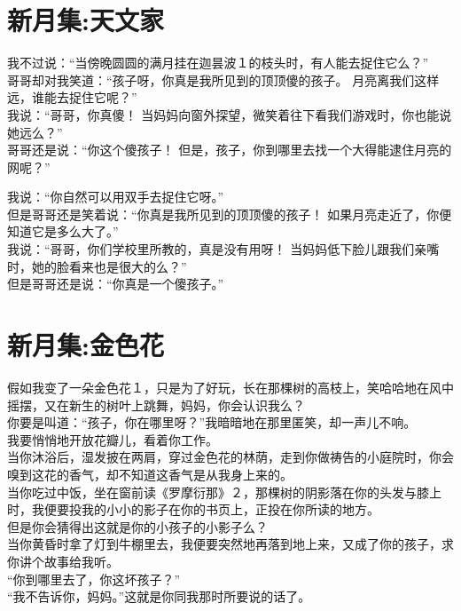 \documentclass[
]{book}
\renewenvironment{quote}{\begin{VF}}{\end{VF}}
\begin{document}
\hypertarget{section-39}{%
\section{新月集:天文家}\label{section-39}}

\begin{quote}
我不过说：``当傍晚圆圆的满月挂在迦昙波１的枝头时，有人能去捉住它么？''\\
哥哥却对我笑道：``孩子呀，你真是我所见到的顶顶傻的孩子。 月亮离我们这样远，谁能去捉住它呢？''\\
我说：``哥哥，你真傻！ 当妈妈向窗外探望，微笑着往下看我们游戏时，你也能说她远么？''\\
哥哥还是说：``你这个傻孩子！ 但是，孩子，你到哪里去找一个大得能逮住月亮的网呢？''

我说：``你自然可以用双手去捉住它呀。''\\
但是哥哥还是笑着说：``你真是我所见到的顶顶傻的孩子！ 如果月亮走近了，你便知道它是多么大了。''\\
我说：``哥哥，你们学校里所教的，真是没有用呀！ 当妈妈低下脸儿跟我们亲嘴时，她的脸看来也是很大的么？''\\
但是哥哥还是说：``你真是一个傻孩子。''
\end{quote}

\hypertarget{section-40}{%
\section{新月集:金色花}\label{section-40}}

\begin{quote}
假如我变了一朵金色花１，只是为了好玩，长在那棵树的高枝上，笑哈哈地在风中摇摆，又在新生的树叶上跳舞，妈妈，你会认识我么？\\
你要是叫道：``孩子，你在哪里呀？''我暗暗地在那里匿笑，却一声儿不响。\\
我要悄悄地开放花瓣儿，看着你工作。\\
当你沐浴后，湿发披在两肩，穿过金色花的林荫，走到你做祷告的小庭院时，你会嗅到这花的香气，却不知道这香气是从我身上来的。\\
当你吃过中饭，坐在窗前读《罗摩衍那》２，那棵树的阴影落在你的头发与膝上时，我便要投我的小小的影子在你的书页上，正投在你所读的地方。\\
但是你会猜得出这就是你的小孩子的小影子么？\\
当你黄昏时拿了灯到牛棚里去，我便要突然地再落到地上来，又成了你的孩子，求你讲个故事给我听。\\
``你到哪里去了，你这坏孩子？''\\
``我不告诉你，妈妈。''这就是你同我那时所要说的话了。
\end{quote}
\end{document}
